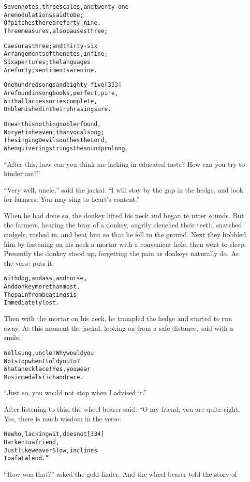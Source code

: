 \documentclass{article}
\renewenvironment{verbatim}{\begin{alltt}\normalfont\begin{centering}}{\end{centering}\end{alltt}}
\begin{document}
\begin{verbatim}
Seven notes, three scales, and twenty-one
    Are modulations said to be;
Of pitches there are forty-nine,
    Three measures, also pauses three;

Caesuras three; and thirty-six
    Arrangements of the notes, in fine;
Six apertures; the languages
    Are forty; sentiments are nine.

One hundred songs and eighty-five                       [333]
    Are found in songbooks, perfect, pure,
With all accessories complete,
    Unblemished in their phrasing sure.

On earth is nothing nobler found,
    Nor yet in heaven, than vocal song;
The singing Devil soothes the Lord,
    When quivering strings the sound prolong.
\end{verbatim}
``After this, how can you think me lacking in educated taste? How can you try to hinder me?''

``Very well, uncle,'' said the jackal.
``I will stay by the gap in the hedge, and look for farmers. You may sing to heart's content.''

When he had done so, the donkey lifted his neck and began to utter
sounds. But the farmers, hearing the bray of a donkey, angrily
clenched their teeth, snatched cudgels, rushed in, and beat him so
that he fell to the ground. Next they hobbled him by fastening on
his neck a mortar with a convenient hole, then went to sleep.
Presently the donkey stood up, forgetting the pain as donkeys
naturally do. As the verse puts it:

\begin{verbatim}
With dog, and ass, and horse,
    And donkey more than most,
The pain from beatings is
    Immediately lost.
\end{verbatim}
Then with the mortar on his neck, he trampled the hedge and started
to run away. At this moment the jackal, looking on from a safe
distance, said with a smile:

\begin{verbatim}
Well sung, uncle! Why would you
Not stop when I told you to?
What a necklace! Yes, you wear
Music medals rich and rare.                             
\end{verbatim}
``Just so, you would not stop when I advised it.''

After listening to this, the wheel-bearer said: “O my friend, you
are quite right. Yes, there is much wisdom in the verse:

\begin{verbatim}
He who, lacking wit, does not                           [334]
    Harken to a friend,
Just like weaver Slow, inclines
    To a fatal end.”
\end{verbatim}
``How was that?'' asked the gold-finder. And the wheel-bearer told
the story of
\end{document}
